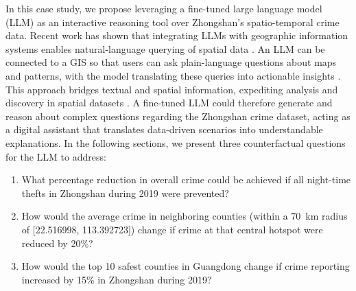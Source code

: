 In this case study, we propose leveraging a fine-tuned large language model (LLM) as an interactive reasoning tool over Zhongshan's spatio-temporal crime data. Recent work has shown that integrating LLMs with geographic information systems enables natural-language querying of spatial data \cite{William2025}. An LLM can be connected to a GIS so that users can ask plain-language questions about maps and patterns, with the model translating these queries into actionable insights \cite{William2025}. This approach bridges textual and spatial information, expediting analysis and discovery in spatial datasets \cite{William2025}. A fine-tuned LLM could therefore generate and reason about complex questions regarding the Zhongshan crime dataset, acting as a digital assistant that translates data-driven scenarios into understandable explanations.
\noindent In the following sections, we present three counterfactual questions for the LLM to address:
\begin{enumerate}
  \item What percentage reduction in overall crime could be achieved if all night-time thefts in Zhongshan during 2019 were prevented?
  \item How would the average crime in neighboring counties (within a 70~km radius of [22.516998, 113.392723]) change if crime at that central hotspot were reduced by 20\%?
  \item How would the top 10 safest counties in Guangdong change if crime reporting increased by 15\% in Zhongshan during 2019?
\end{enumerate}

